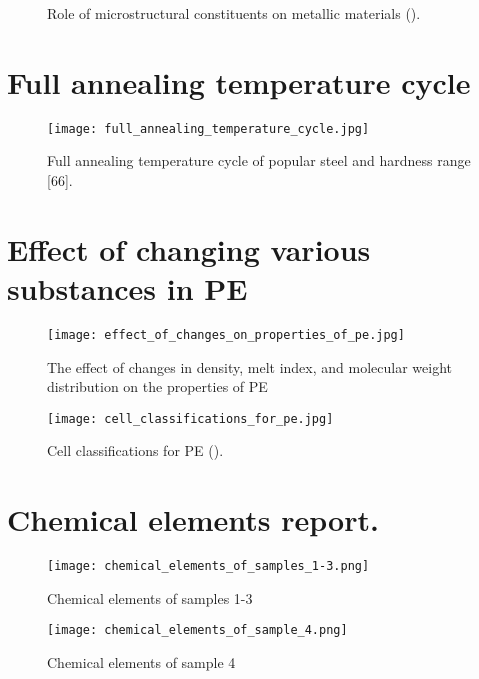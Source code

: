 \begin{figure}[H]
\caption{Role of microstructural constituents on metallic materials (\cite{suryanarayana2017microstructure}).}
\label{appendix:role}
\end{figure}

\section*{Full annealing temperature cycle}
\begin{figure}[H]
    \texttt{[image: full\_annealing\_temperature\_cycle.jpg]}
    \caption{Full annealing temperature cycle of popular steel and hardness range [66].}
    \label{appendix:range}
\end{figure}

\section*{Effect of changing various substances in PE}
\begin{figure}[H]
    \texttt{[image: effect\_of\_changes\_on\_properties\_of\_pe.jpg]}
    \caption{The effect of changes in density, melt index, and molecular weight distribution on the properties of PE \cite{gabriel1998history}}
\end{figure}

\begin{figure}[H]
    \texttt{[image: cell\_classifications\_for\_pe.jpg]}
    \caption{Cell classifications for PE (\cite{peacock2000handbook}).}
    \label{appendix:classifications}
\end{figure}

\section*{Chemical elements report.}
\begin{figure}[H]
    \texttt{[image: chemical\_elements\_of\_samples\_1-3.png]}
    \caption{Chemical elements of samples 1-3}
    \label{appendix:samples_1-3}
\end{figure}

\begin{figure}[H]
    \texttt{[image: chemical\_elements\_of\_sample\_4.png]}
    \caption{Chemical elements of sample 4}
    \label{appendix:sample4}
\end{figure}